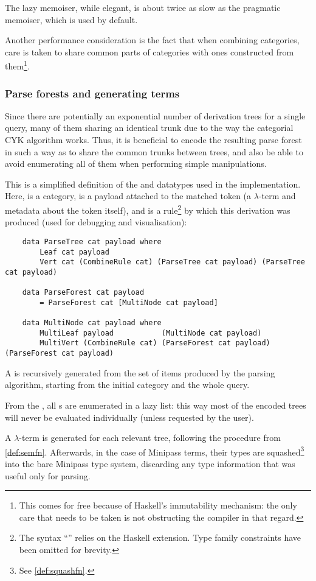 \documentclass[main.tex]{subfiles}
\begin{document}
The lazy memoiser, while elegant, is about twice as slow as the pragmatic
memoiser, which is used by default.

Another performance consideration is the fact that when combining categories,
care is taken to share common parts of categories with ones constructed from
them\footnote{This comes for free because of Haskell's immutability mechanism:
    the only care that needs to be taken is not obstructing the compiler in
    that regard.
}.

\subsubsection{Parse forests and generating terms}\label{sec:termgen}
Since there are potentially an exponential number of derivation trees for a
single query, many of them sharing an identical trunk due to the way
the categorial CYK algorithm works. Thus, it is beneficial to encode the resulting
parse forest in such a way as to share the common trunks between trees, and
also be able to avoid enumerating all of them when performing simple manipulations.

This is a simplified definition of the  and 
datatypes used in the implementation. Here,  is a category,
 is a payload attached to the matched token (a $\lambda$-term and
metadata about the token itself), and  is a rule\footnote{
    The syntax ``'' relies on the 
    Haskell extension. Type family constraints have been omitted for brevity.
} by which this derivation was produced (used for debugging and visualisation):
\begin{lstwrap}\begin{lstlisting}
    data ParseTree cat payload where
        Leaf cat payload
        Vert cat (CombineRule cat) (ParseTree cat payload) (ParseTree cat payload)

    data ParseForest cat payload
        = ParseForest cat [MultiNode cat payload]

    data MultiNode cat payload where
        MultiLeaf payload           (MultiNode cat payload)
        MultiVert (CombineRule cat) (ParseForest cat payload) (ParseForest cat payload)
\end{lstlisting}\end{lstwrap}

A  is recursively generated from the set of items produced
by the parsing algorithm, starting from the initial category and the whole query.

From the , all s are enumerated in a lazy
list: this way most of the encoded trees will never be evaluated individually
(unless requested by the user).

A $\lambda$-term is generated for each relevant tree, following the procedure
from \cref{def:semfn}. Afterwards, in the case of Minipass terms, their types are
squashed\footnote{See \cref{def:squashfn}.} into the bare Minipass type system,
discarding any type information that was useful only for parsing.
\end{document}
